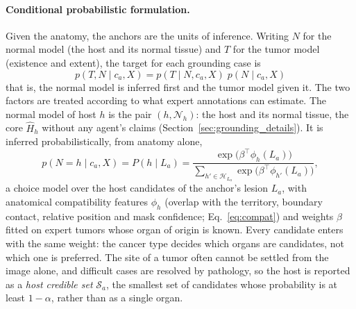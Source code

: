 \documentclass[fleqn,10pt]{olplainarticle}
\begin{document}
\paragraph{Conditional probabilistic formulation.}
Given the anatomy, the anchors are the units of inference. Writing $N$ for the normal model (the host and its normal
tissue) and $T$ for the tumor model (existence and extent), the target for each grounding case is
\begin{equation}
\label{eq:conditional_joint}
\boxed{
p(T,N\mid c_a,X)=p(T\mid N,c_a,X)\;p(N\mid c_a,X)
}
\end{equation}
that is, the normal model is inferred first and the tumor model given it. The two factors are treated according to what
expert annotations can estimate. The normal model of host $h$ is the pair $(h,\mathcal{N}_h)$: the host and its normal
tissue, the core $\hat H_h$ without any agent's claims (Section~\ref{sec:grounding_details}). It is inferred
probabilistically, from anatomy alone,
\begin{equation}
\label{eq:normal_model}
p(N=h\mid c_a,X)=P(h\mid L_a)=\frac{\exp\bigl(\beta^\top\phi_h(L_a)\bigr)}{\sum_{h'\in\mathcal{H}_{L_a}}\exp\bigl(\beta^\top\phi_{h'}(L_a)\bigr)},
\end{equation}
a choice model over the host candidates of the anchor's lesion $L_a$, with anatomical compatibility features $\phi_h$
(overlap with the territory, boundary contact, relative position and mask confidence; Eq.~\eqref{eq:compat}) and weights
$\beta$ fitted on expert tumors whose organ of origin is known. Every candidate enters with the same weight: the cancer
type decides which organs are candidates, not which one is preferred. The site of a tumor often cannot be settled from the
image alone, and difficult cases are resolved by pathology, so the host is reported as a \emph{host credible set}
$\mathcal{S}_a$, the smallest set of candidates whose probability is at least $1-\alpha$, rather than as a single organ.
\end{document}
